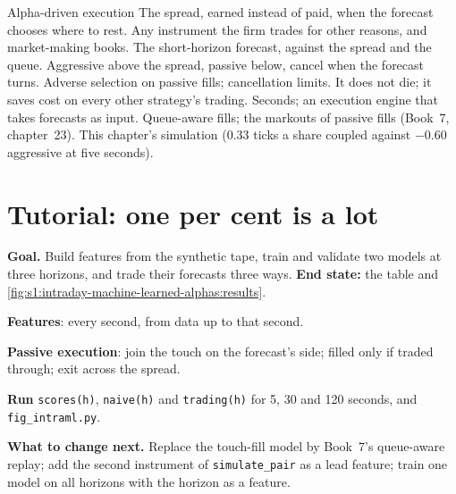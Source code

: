 \begin{strategyfile}{Alpha-driven execution}\label{strat:s1:intraday-machine-learned-alphas:execution}
 The spread, earned instead of paid, when the forecast chooses where to rest.
 Any instrument the firm trades for other reasons, and market-making books.
 The short-horizon forecast, against the spread and the queue.
 Aggressive above the spread, passive below, cancel when the forecast turns.
 Adverse selection on passive fills; cancellation limits.
 It does not die; it saves cost on every other strategy's trading.
 Seconds; an execution engine that takes forecasts as input.
 Queue-aware fills; the markouts of passive fills (Book~7, chapter~23).
 This chapter's simulation (0.33 ticks a share coupled against $-0.60$ aggressive at five seconds).
\end{strategyfile}

\section{Tutorial: one per cent is a lot}\label{tut:s1:intraday-machine-learned-alphas:tut}

\begin{tutorial}
\textbf{Goal.} Build features from the synthetic tape, train and validate two models at three horizons, and trade their forecasts three ways. \textbf{End state:}
the table and \cref{fig:s1:intraday-machine-learned-alphas:results}.
\begin{tutsteps}
\item \textbf{Features}: every second, from data up to that second.
\label{lst:s1:intraday-machine-learned-alphas:features}
\item \textbf{Passive execution}: join the touch on the forecast's side; filled only if traded through; exit across the spread.
\label{lst:s1:intraday-machine-learned-alphas:passive}
\item \textbf{Run} \texttt{scores(h)}, \texttt{naive(h)} and \texttt{trading(h)} for 5, 30 and 120 seconds, and \texttt{fig\_intraml.py}.
\end{tutsteps}
\textbf{What to change next.} Replace the touch-fill model by Book~7's queue-aware replay; add the second instrument of \texttt{simulate\_pair} as a lead
feature; train one model on all horizons with the horizon as a feature.
\end{tutorial}

